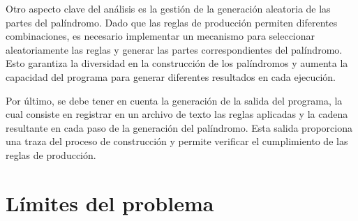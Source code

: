 Otro aspecto clave del análisis es la gestión de la generación aleatoria de las partes del palíndromo. Dado que las reglas de producción permiten diferentes combinaciones, es necesario implementar un mecanismo para seleccionar aleatoriamente las reglas y generar las partes correspondientes del palíndromo. Esto garantiza la diversidad en la construcción de los palíndromos y aumenta la capacidad del programa para generar diferentes resultados en cada ejecución.\newline

Por último, se debe tener en cuenta la generación de la salida del programa, la cual consiste en registrar en un archivo de texto las reglas aplicadas y la cadena resultante en cada paso de la generación del palíndromo. Esta salida proporciona una traza del proceso de construcción y permite verificar el cumplimiento de las reglas de producción.\newline



\section{Límites del problema}%

